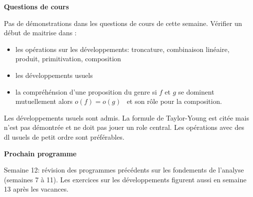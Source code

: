 








\bigskip
\begin{center}
 \textbf{Questions de cours}
\end{center}
Pas de démonstrations dans les questions de cours de cette semaine.\newline 
Vérifier un début de maitrise dans :
\begin{itemize}
 \item les opérations sur les développements: troncature, combinaison linéaire, produit, primitivation, composition
 \item les développements usuels
 \item la compréhénsion d'une proposition du genre \og si $f$ et $g$ se dominent mutuellement alors $o(f) = o(g)$\fg~ et son rôle pour la composition.
\end{itemize}
Les développements usuels sont admis. La formule de Taylor-Young est citée mais n'est pas démontrée et ne doit pas jouer un role central. Les opérations avec des dl usuels de petit ordre sont préférables.

\begin{center}
 \textbf{Prochain programme}
\end{center}

Semaine 12: révision des programmes précédents sur les fondements de l'analyse (semaines 7 à 11).\newline
Les exercices sur les développements figurent aussi en semaine 13 après les vacances.



